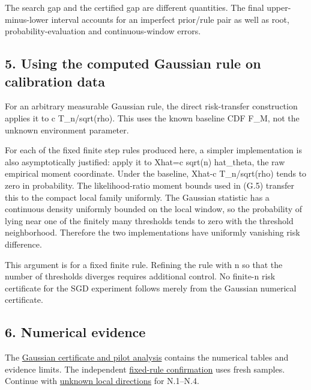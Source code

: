 The search gap and the certified gap are different quantities. The final
upper-minus-lower interval accounts for an imperfect prior/rule pair as
well as root, probability-evaluation and continuous-window errors.

\subsection{5. Using the computed Gaussian rule on calibration
data}\label{gaussian_decision-using-the-computed-gaussian-rule-on-calibration-data}

For an arbitrary measurable Gaussian rule, the direct risk-transfer
construction applies it to c T\_n/sqrt(rho). This uses the known
baseline CDF F\_M, not the unknown environment parameter.

For each of the fixed finite step rules produced here, a simpler
implementation is also asymptotically justified: apply it to Xhat=c
sqrt(n) hat\_theta, the raw empirical moment coordinate. Under the
baseline, Xhat-c T\_n/sqrt(rho) tends to zero in probability. The
likelihood-ratio moment bounds used in (G.5) transfer this to the
compact local family uniformly. The Gaussian statistic has a continuous
density uniformly bounded on the local window, so the probability of
lying near one of the finitely many thresholds tends to zero with the
threshold neighborhood. Therefore the two implementations have uniformly
vanishing risk difference.

This argument is for a fixed finite rule. Refining the rule with n so
that the number of thresholds diverges requires additional control. No
finite-n risk certificate for the SGD experiment follows merely from the
Gaussian numerical certificate.

\subsection{6. Numerical evidence}\label{gaussian_decision-numerical-evidence}

The \href{../experiments/results/gaussian_decision/analysis.md}{Gaussian
certificate and pilot analysis} contains the numerical tables and
evidence limits. The independent
\href{../experiments/results/precision_confirmation/analysis.md}{fixed-rule
confirmation} uses fresh samples. Continue with
\href{unknown_direction.md}{unknown local directions} for N.1--N.4.
